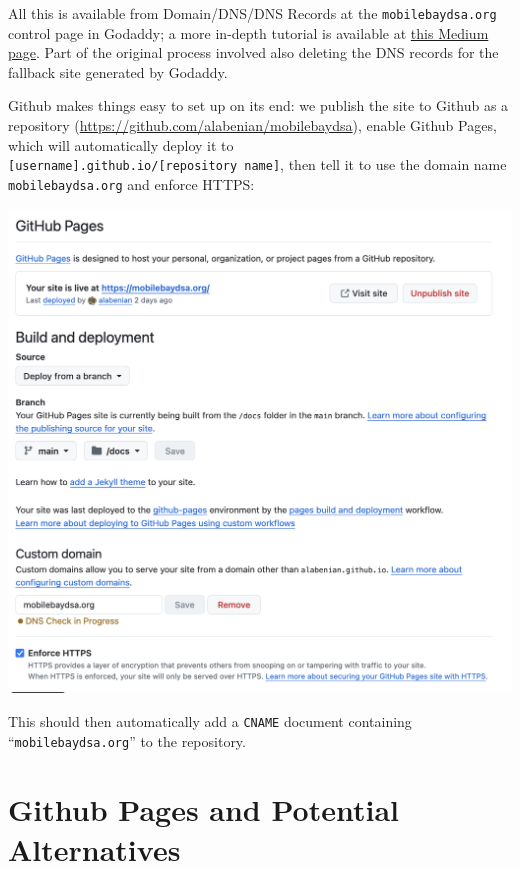 \documentclass[
]{book}
\begin{document}
All this is available from Domain/DNS/DNS Records at the \texttt{mobilebaydsa.org} control page in Godaddy; a more in-depth tutorial is available at \href{https://medium.com/@nbblks/how-to-set-up-godaddy-domain-with-github-pages-eaa65f88a8ec}{this Medium page}. Part of the original process involved also deleting the DNS records for the fallback site generated by Godaddy.

Github makes things easy to set up on its end: we publish the site to Github as a repository (\url{https://github.com/alabenian/mobilebaydsa}), enable Github Pages, which will automatically deploy it to \texttt{{[}username{]}.github.io/{[}repository\ name{]}}, then tell it to use the domain name \texttt{mobilebaydsa.org} and enforce HTTPS:

\includegraphics[width=0.75\linewidth,height=\textheight,keepaspectratio]{github-pages.png}

This should then automatically add a \texttt{CNAME} document containing ``\texttt{mobilebaydsa.org}'' to the repository.

\section{Github Pages and Potential Alternatives}\label{github-pages-and-potential-alternatives}
\end{document}
